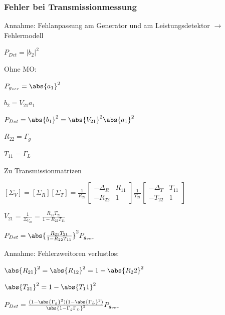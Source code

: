 \subsubsection{Fehler bei Transmissionmessung}

Annahme: Fehlanpassung am Generator und am Leistungsdetektor
$\rightarrow$ Fehlermodell

\begin{pitemize}
    \item $P_{Det} = \lvert b_2\rvert^2$
    \item Ohne MO:
    \begin{pitemize}
        \item {}
        \item $P_{g_{ver}} = \abs{a_1}^2$
        \item $b_2 = V_{21}a_1$
        \item $P_{Det} = \abs{b_1}^2 = \abs{V_{21}}^2 \abs{a_1}^2$
        \item $R_{22} = \Gamma_g$
        \item $T_{11} = \Gamma_L$
        \item Zu Transmissionmatrizen
        \item $\left[\Sigma_V\right] = \left[\Sigma_R\right] \left[\Sigma_T\right] = \frac{1}{R_21}\begin{bmatrix}
            -\Delta_R & R_{11} \\ -R_{22} & 1
        \end{bmatrix}\frac{1}{T_21}\begin{bmatrix}
            -\Delta_T & T_{11} \\ -T_{22} & 1
        \end{bmatrix}$
        \item $V_{21} = \frac{1}{\Sigma_{V_{22}}} = \frac{R_21 T_21}{1 - R_22 T_11}$
        \item $P_{Det} = \abs{\frac{R_{21} T_{21}}{1 - R_{22} T_{11}}}^2 P_{g_{ver}}$
        \item Annahme: Fehlerzweitoren verlustlos: 
        \begin{pitemize}
            \item $\abs{R_{21}}^2 = \abs{R_{12}}^2 = 1 - \abs{R_22}^2$
            \item $ \abs{T_{21}}^2 = 1 - \abs{T_11}^2$
        \end{pitemize}
        \item $P_{Det} = \frac{(1 - \abs{\Gamma_g}^2)(1 - \abs{\Gamma_L}^2)}{\abs{1 - \Gamma_g \Gamma_L}^2} P_{g_{ver}}$    

\end{pitemize}
\end{pitemize}
